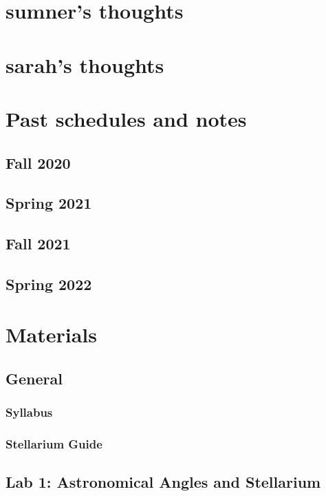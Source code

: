 \documentclass[12pt]{article}
\begin{document}
\newpage
\section{sumner's thoughts}


\section{sarah's thoughts}


\section{Past schedules and notes}


\subsection{Fall 2020}


\subsection{Spring 2021}


\subsection{Fall 2021}


\subsection{Spring 2022}


\newpage
\section{Materials}


\subsection{General}


\subsubsection{Syllabus}


\subsubsection{Stellarium Guide}


\subsection{Lab 1: Astronomical Angles and Stellarium}
\end{document}
